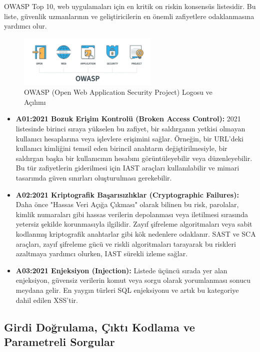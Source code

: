 OWASP Top 10, web uygulamaları için en kritik on riskin konsensüs listesidir. Bu liste, güvenlik uzmanlarının ve geliştiricilerin en önemli zafiyetlere odaklanmasına yardımcı olur.

\begin{figure}[H]
    \centering
    \includegraphics[width=0.6\textwidth]{img/owasp-standsfor.png}
    \caption{OWASP (Open Web Application Security Project) Logosu ve Açılımı}
    \label{fig:owasp-logo}
\end{figure}



\begin{itemize}
\item \textbf{A01:2021 Bozuk Erişim Kontrolü (Broken Access Control):} 2021 listesinde birinci sıraya yükselen bu zafiyet, bir saldırganın yetkisi olmayan kullanıcı hesaplarına veya işlevlere erişimini sağlar. Örneğin, bir URL'deki kullanıcı kimliğini temsil eden birincil anahtarın değiştirilmesiyle, bir saldırgan başka bir kullanıcının hesabını görüntüleyebilir veya düzenleyebilir. Bu tür zafiyetlerin giderilmesi için IAST araçları kullanılabilir ve mimari tasarımda güven sınırları oluşturulması gerekebilir.
\item \textbf{A02:2021 Kriptografik Başarısızlıklar (Cryptographic Failures):} Daha önce "Hassas Veri Açığa Çıkması" olarak bilinen bu risk, parolalar, kimlik numaraları gibi hassas verilerin depolanması veya iletilmesi sırasında yetersiz şekilde korunmasıyla ilgilidir. Zayıf şifreleme algoritmaları veya sabit kodlanmış kriptografik anahtarlar gibi kök nedenlere odaklanır. SAST ve SCA araçları, zayıf şifreleme gücü ve riskli algoritmaları tarayarak bu riskleri azaltmaya yardımcı olurken, IAST sürekli izleme sağlar.
\item \textbf{A03:2021 Enjeksiyon (Injection):} Listede üçüncü sırada yer alan enjeksiyon, güvensiz verilerin komut veya sorgu olarak yorumlanması sonucu meydana gelir. En yaygın türleri SQL enjeksiyonu ve artık bu kategoriye dahil edilen XSS'tir.
\end{itemize}

\subsection{Girdi Doğrulama, Çıktı Kodlama ve Parametreli Sorgular}

